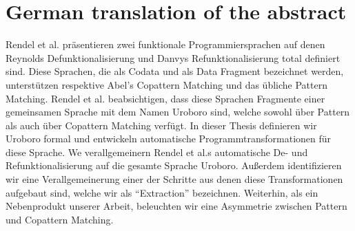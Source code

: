 \chapter{German translation of the abstract}

Rendel et al. präsentieren zwei funktionale Programmiersprachen auf denen Reynolds Defunktionalisierung und Danvys Refunktionalisierung total definiert sind. Diese Sprachen, die als Codata und als Data Fragment bezeichnet werden, unterstützen respektive Abel's Copattern Matching und das übliche Pattern Matching. Rendel et al. beabsichtigen, dass diese Sprachen Fragmente einer gemeinsamen Sprache mit dem Namen Uroboro sind, welche sowohl über Pattern als auch über Copattern Matching verfügt. In dieser Thesis definieren wir Uroboro formal und entwickeln automatische Programmtransformationen für diese Sprache. We verallgemeinern Rendel et al.s automatische De- und Refunktionalisierung auf die gesamte Sprache Uroboro. Außerdem identifizieren wir eine Verallgemeinerung einer der Schritte aus denen diese Transformationen aufgebaut sind, welche wir als ``Extraction'' bezeichnen. Weiterhin, als ein Nebenprodukt unserer Arbeit, beleuchten wir eine Asymmetrie zwischen Pattern und Copattern Matching.
